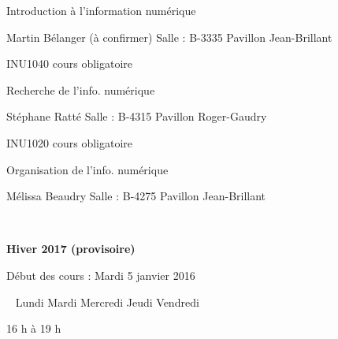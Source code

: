 \documentclass [12 pt]{article}
\begin{document}
                                
                                    Introduction à l'information numérique
                                
                                Martin Bélanger (à confirmer)
                                Salle : B-3335
                                Pavillon Jean-Brillant
                            
                            
                                
                                    INU1040 cours obligatoire
                                
                                
                                    Recherche de l'info. numérique
                                
                                Stéphane Ratté
                                Salle : B-4315
                                Pavillon Roger-Gaudry
                            
                            
                                
                                    INU1020 cours obligatoire
                                
                                
                                    Organisation de l'info. numérique
                                
                                Mélissa Beaudry
                                Salle : B-4275
                                Pavillon Jean-Brillant
                            
                             
                        
                    
                
            
            
        \textbf{
        Hiver 2017 (provisoire)
        }
    
            Début des cours : Mardi 5 janvier 2016
            
                
                    
                        
                             
                            Lundi
                            Mardi
                            Mercredi
                            Jeudi
                            Vendredi
                        
                        
                            
                                16 h à 19 h
                            
\end{document}
